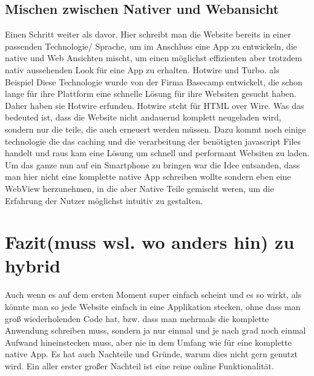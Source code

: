 \subsection{Mischen zwischen Nativer und Webansicht}
Einen Schritt weiter als davor. Hier schreibt man die Website bereits in einer passenden Technologie/ Sprache, um im Anschluss eine App zu entwickeln, die native und Web Ansichten mischt, um einen möglichst effizienten aber trotzdem nativ aussehenden Look für eine App zu erhalten. Hotwire und Turbo. als Beispiel
Diese Technologie wurde von der Firma Basecamp entwickelt, die schon lange für ihre Plattform eine schnelle Lösung für ihre Websiten gesucht haben. Daher haben sie Hotwire erfunden. Hotwire steht für HTML over Wire. Was das bedeuted ist, dass die Website nicht andauernd komplett neugeladen wird, sondern nur die teile, die auch erneuert werden müssen. Dazu kommt noch einige technologie die das caching und die verarbeitung der benötigten javascript Files handelt und raus kam eine Lösung um schnell und performant Websiten zu laden.
Um das ganze nun auf ein Smartphone zu bringen war die Idee entsanden, dass man hier nicht eine komplette native App schreiben wollte sondern eben eine WebView herzunehmen, in die aber Native Teile gemischt weren, um die Erfahrung der Nutzer möglichst intuitiv zu gestalten. 



\section{Fazit(muss wsl. wo anders hin) zu hybrid}
Auch wenn es auf dem ersten Moment super einfach scheint und es so wirkt, als könnte man so jede Website einfach in eine Applikation stecken, ohne dass man groß wiederholenden Code hat, bzw. dass man mehrmals die komplette Anwendung schreiben muss, sondern ja nur einmal und je nach grad noch einmal Aufwand hineinstecken muss, aber nie in dem Umfang wie für eine komplette native App. 
Es hat auch Nachteile und Gründe, warum dies nicht gern genutzt wird.
Ein aller erster großer Nachteil ist eine reine online Funktionalität. 